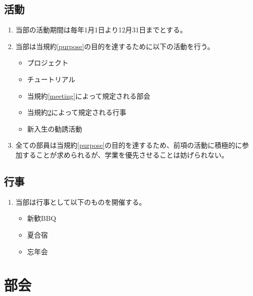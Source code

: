 \documentclass[12pt, unicode, a4paper]{ltjsreport}
\begin{document}
    \section{活動}\label{activity}
        \begin{enumerate}
            \item 当部の活動期間は毎年1月1日より12月31日までとする。
            \item 当部は当規約\ref{purpose}の目的を達するために以下の活動を行う。
            \begin{itemize}
                \item プロジェクト
                \item チュートリアル
                \item 当規約\ref{meeting}によって規定される部会
                \item 当規約\ref{event}によって規定される行事
                \item 新入生の勧誘活動
            \end{itemize}
            \item 全ての部員は当規約\ref{purpose}の目的を達するため、前項の活動に積極的に参加することが求められるが、学業を優先させることは妨げられない。
        \end{enumerate}

    \section{行事}\label{event}
        \begin{enumerate}
            \item 当部は行事として以下のものを開催する。
            \begin{itemize}
                \item 新歓BBQ
                \item 夏合宿
                \item 忘年会
            \end{itemize}
        \end{enumerate}


\chapter{部会}
\end{document}
